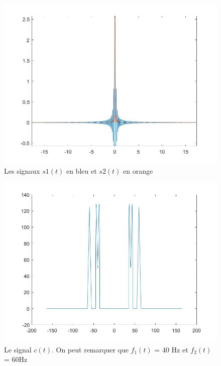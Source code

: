 \documentclass[10pt,a4paper]{article}
\begin{document}
\begin{figure}[h]
\begin{center}
\includegraphics[scale=0.35]{tf_2signaux.jpg}
\caption{Les signaux $s1(t)$  en bleu et $s2(t)$ en orange}
\label{s1s2}
\end{center}
\end{figure}


\begin{figure}	\begin{center}
\includegraphics[scale=0.35]{tf_fctc.jpg}
\caption{Le signal $c(t)$. On peut remarquer que $f_1(t)$ = 40 Hz et $f_2(t)$ = 60Hz}
\label{c}
\end{center}	\end{figure}
\end{document}

